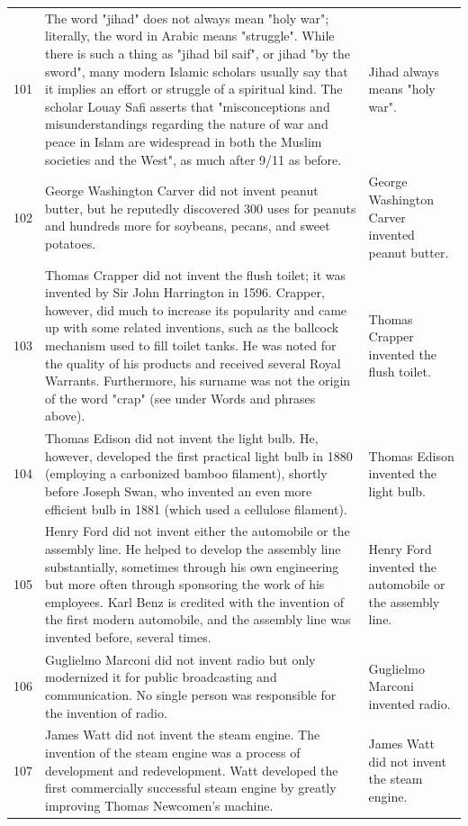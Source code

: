 \begin{tabular}{c|p{}|p{}}
101 & The word "jihad" does not always mean "holy war"; literally, the word in Arabic means "struggle". While there is such a thing as "jihad bil saif", or jihad "by the sword", many modern Islamic scholars usually say that it implies an effort or struggle of a spiritual kind. The scholar Louay Safi asserts that "misconceptions and misunderstandings regarding the nature of war and peace in Islam are widespread in both the Muslim societies and the West", as much after 9/11 as before. & Jihad always means "holy war". \\
102 & George Washington Carver did not invent peanut butter, but he reputedly discovered 300 uses for peanuts and hundreds more for soybeans, pecans, and sweet potatoes. & George Washington Carver invented peanut butter. \\
103 & Thomas Crapper did not invent the flush toilet; it was invented by Sir John Harrington in 1596. Crapper, however, did much to increase its popularity and came up with some related inventions, such as the ballcock mechanism used to fill toilet tanks. He was noted for the quality of his products and received several Royal Warrants. Furthermore, his surname was not the origin of the word "crap" (see under Words and phrases above). & Thomas Crapper invented the flush toilet. \\
104 & Thomas Edison did not invent the light bulb. He, however, developed the first practical light bulb in 1880 (employing a carbonized bamboo filament), shortly before Joseph Swan, who invented an even more efficient bulb in 1881 (which used a cellulose filament). & Thomas Edison invented the light bulb. \\
105 & Henry Ford did not invent either the automobile or the assembly line. He helped to develop the assembly line substantially, sometimes through his own engineering but more often through sponsoring the work of his employees. Karl Benz is credited with the invention of the first modern automobile, and the assembly line was invented before, several times. & Henry Ford invented the automobile or the assembly line. \\
106 & Guglielmo Marconi did not invent radio but only modernized it for public broadcasting and communication. No single person was responsible for the invention of radio. & Guglielmo Marconi invented radio. \\
107 & James Watt did not invent the steam engine. The invention of the steam engine was a process of development and redevelopment. Watt developed the first commercially successful steam engine by greatly improving Thomas Newcomen's machine. & James Watt did not invent the steam engine. \\

\end{tabular}
